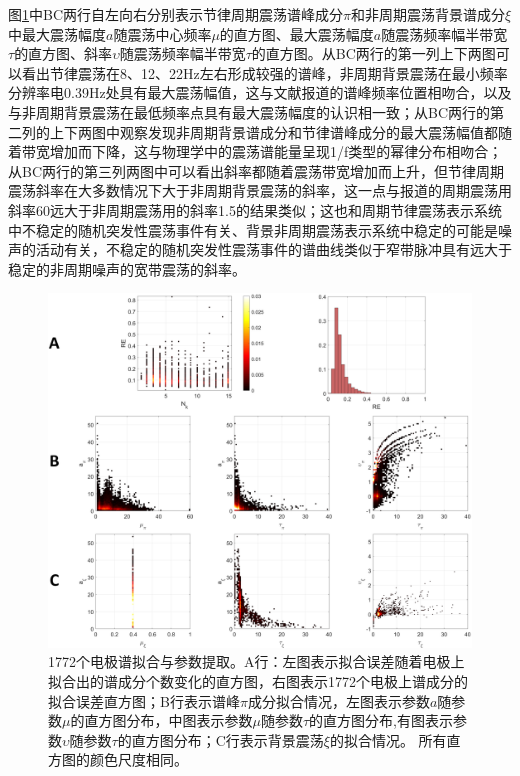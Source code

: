 图\ref{para}中BC两行自左向右分别表示节律周期震荡谱峰成分$\pi$和非周期震荡背景谱成分$\xi$中最大震荡幅度$a$随震荡中心频率$\mu$的直方图、最大震荡幅度$a$随震荡频率幅半带宽$\tau$的直方图、斜率$\upsilon$随震荡频率幅半带宽$\tau$的直方图。从BC两行的第一列上下两图可以看出节律震荡在8、12、22Hz左右形成较强的谱峰，非周期背景震荡在最小频率分辨率电0.39Hz处具有最大震荡幅值，这与文献\cite{frauscher2018atlas}报道的谱峰频率位置相吻合，以及与非周期背景震荡在最低频率点具有最大震荡幅度的认识相一致；从BC两行的第二列的上下两图中观察发现非周期背景谱成分和节律谱峰成分的最大震荡幅值都随着带宽增加而下降，这与物理学中的震荡谱能量呈现1/f类型的幂律分布相吻合；从BC两行的第三列两图中可以看出斜率都随着震荡带宽增加而上升，但节律周期震荡斜率在大多数情况下大于非周期背景震荡的斜率，这一点与\cite{pascual1988parametric,amador1989structure,amador1990spatiotemporal}报道的周期震荡用斜率60远大于非周期震荡用的斜率1.5的结果类似；这也和周期节律震荡表示系统中不稳定的随机突发性震荡事件有关、背景非周期震荡表示系统中稳定的可能是噪声的活动有关，不稳定的随机突发性震荡事件的谱曲线类似于窄带脉冲具有远大于稳定的非周期噪声的宽带震荡的斜率。
\begin{figure}
\includegraphics[width=15cm]{pic/xipi/para.png}
\caption{1772个电极谱拟合与参数提取。A行：左图表示拟合误差随着电极上拟合出的谱成分个数变化的直方图，右图表示1772个电极上谱成分的拟合误差直方图；B行表示谱峰$\pi$成分拟合情况，左图表示参数$a$随参数$\mu$的直方图分布，中图表示参数$\mu$随参数$\tau$的直方图分布,有图表示参数$\upsilon$随参数$\tau$的直方图分布；C行表示背景震荡$\xi$的拟合情况。 所有直方图的颜色尺度相同。}
\label{para}
\end{figure}

